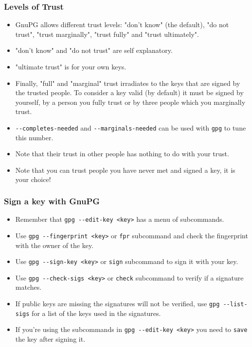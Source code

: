 \documentclass[hyperref={colorlinks=true}]{beamer}
\begin{document}
\begin{frame}[fragile]\frametitle{Levels of Trust}
  \begin{itemize}
    \item GnuPG allows different trust levels: "don't know" (the default), "do
not trust", "trust marginally", "trust fully" and "trust ultimately".
    \item "don't know" and "do not trust" are self explanatory.
    \item "ultimate trust" is for your own keys.
    \item Finally, "full" and "marginal" trust irradiates to the keys that are
signed by the trusted people.  To consider a key valid (by default) it must be
signed by yourself, by a person you fully trust or by three people which you
marginally trust.
    \item \verb|--completes-needed| and \verb|--marginals-needed| can be used
with \verb|gpg| to tune this number.
    \item Note that their trust in other people has nothing to do with your
trust.
    \item Note that you can trust people you have never met and signed a key,
it is your choice!
  \end{itemize}
\end{frame}

\begin{frame}[fragile]\frametitle{Sign a key with GnuPG}
  \begin{itemize}
    \item Remember that \verb|gpg --edit-key <key>| has a menu of subcommands.
    \item Use \verb|gpg --fingerprint <key>| or \verb|fpr| subcommand and check
the fingerprint with the owner of the key.
    \item Use \verb|gpg --sign-key <key>| or \verb|sign| subcommand to sign it
with your key.
    \item Use \verb|gpg --check-sigs <key>| or \verb|check| subcommand to
verify if a signature matches.
    \item If public keys are missing the signatures will not be verified, use
\verb|gpg --list-sigs| for a list of the keys used in the signatures.
    \item If you're using the subcommands in \verb|gpg --edit-key <key>| you
need to \verb|save| the key after signing it.
  \end{itemize}
\end{frame}
\end{document}
